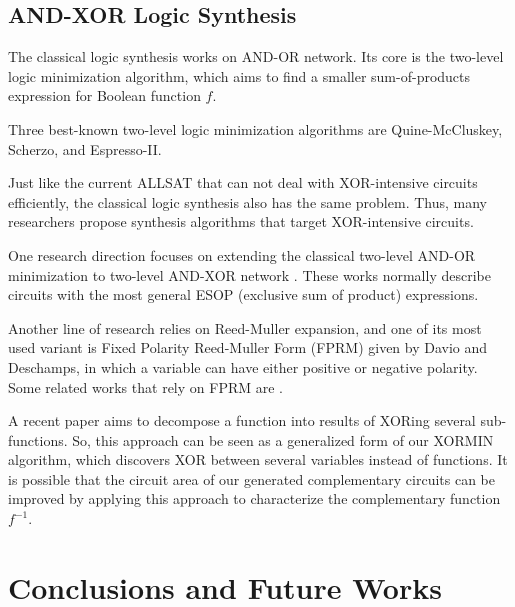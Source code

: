 \documentclass[journal]{IEEEtran}
\begin{document}
\subsection{AND-XOR Logic Synthesis}\label{subsec_XORlogsyn}

The classical logic synthesis works on AND-OR network.
Its core is the two-level logic minimization algorithm,
which aims to find a smaller sum-of-products expression for Boolean function $f$.

Three best-known two-level logic minimization algorithms are Quine-McCluskey\cite{McCluskey},
Scherzo\cite{Scherzo},
and Espresso-II\cite{Espresso}.

Just like the current ALLSAT that can not deal with XOR-intensive circuits efficiently,
the classical logic synthesis also has the same problem.
Thus,
many researchers propose synthesis algorithms that target XOR-intensive circuits.

One research direction focuses on extending the classical two-level AND-OR minimization to two-level AND-XOR network \cite{Mod2sum,ANDEXOR}.
These works normally describe circuits with the most general ESOP (exclusive sum of product) expressions.

Another line of research relies on Reed-Muller expansion\cite{Reed},
and one of its most used variant is Fixed Polarity Reed-Muller Form (FPRM) given by Davio and Deschamps\cite{FPRM},
in which a variable can have either positive or negative polarity.
Some related works that rely on FPRM are \cite{fastexactFPRM,fastOFDD,lowpowerXOR}.

A recent paper\cite{FuncXOR} aims to decompose a function into results of XORing several sub-functions.
So,
this approach can be seen as a generalized form of our XORMIN algorithm,
which discovers XOR between several variables instead of functions.
It is possible that
the circuit area of our generated complementary circuits can be improved by applying this approach to characterize the complementary function $f^{-1}$.


\section{Conclusions and Future Works}\label{sec_con}
\end{document}
